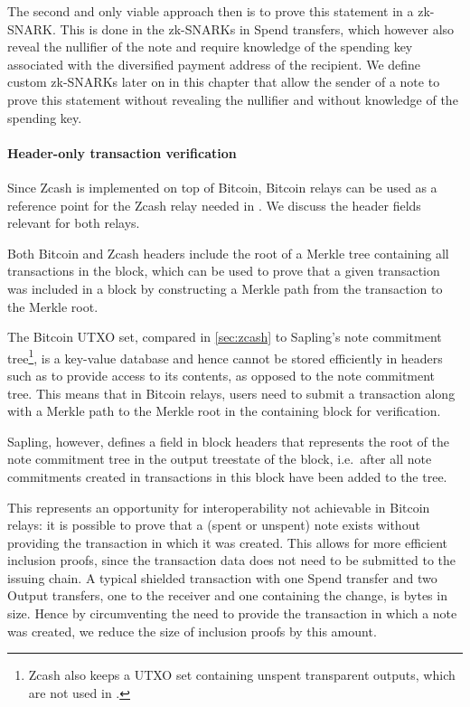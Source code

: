 The second and only viable approach then is to prove this statement in a zk-SNARK.
This is done in the \pis zk-SNARKs in Spend transfers, which however also reveal the nullifier of the note and require knowledge of the spending key associated with the diversified payment address of the recipient.
We define custom zk-SNARKs later on in this chapter that allow the sender of a note to prove this statement without revealing the nullifier and without knowledge of the spending key.

\paragraph{Header-only transaction verification}
Since Zcash is implemented on top of Bitcoin, Bitcoin relays can be used as a reference point for the Zcash relay needed in \zclaim.
We discuss the header fields relevant for both relays.

Both Bitcoin and Zcash headers include the root of a Merkle tree containing all transactions in the block, which can be used to prove that a given transaction was included in a block by constructing a Merkle path from the transaction to the Merkle root.

The Bitcoin UTXO set, compared in \cref{sec:zcash} to Sapling's note commitment tree\footnote{Zcash also keeps a UTXO set containing unspent transparent outputs, which are not used in \zclaim.}, is a key-value database and hence cannot be stored efficiently in headers such as to provide access to its contents, as opposed to the note commitment tree.
This means that in Bitcoin relays, users need to submit a transaction along with a Merkle path to the Merkle root in the containing block for verification.

Sapling, however, defines a field \hfsr in block headers that represents the root of the note commitment tree in the output treestate of the block, i.e.\ after all note commitments created in transactions in this block have been added to the tree.

This represents an opportunity for interoperability not achievable in Bitcoin relays: it is possible to prove that a (spent or unspent) note exists without providing the transaction in which it was created.
This allows for more efficient inclusion proofs, since the transaction data does not need to be submitted to the issuing chain.
A typical shielded transaction with one Spend transfer and two Output transfers, one to the receiver and one containing the change, is  bytes in size.
Hence by circumventing the need to provide the transaction in which a note was created, we reduce the size of inclusion proofs by this amount.

